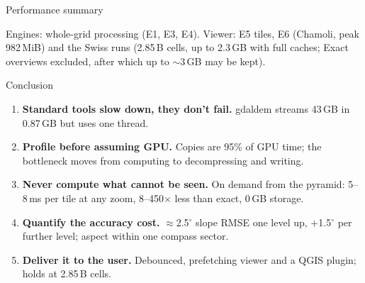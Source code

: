 \documentclass[aspectratio=169,11pt]{beamer}
\begin{document}
\begin{frame}{Performance summary}
\centering
\small
\renewcommand{\arraystretch}{1.2}
\vspace{6pt}
\begin{flushleft}\scriptsize\color{ink2}
Engines: whole-grid processing (E1, E3, E4). Viewer: E5 tiles, E6 (Chamoli, peak 982\,MiB) and the Swiss runs (2.85\,B
cells, up to 2.3\,GB with full caches; Exact overviews excluded, after which up to $\sim$3\,GB may be kept).
\end{flushleft}
\end{frame}

\begin{frame}{Conclusion}
\begin{enumerate}
  \setlength\itemsep{5pt}
  \item \textbf{Standard tools slow down, they don't fail.} gdaldem streams 43\,GB in 0.87\,GB but uses one thread.
  \item \textbf{Profile before assuming GPU.} Copies are 95\% of GPU time; the bottleneck moves from computing to
  decompressing and writing.
  \item \textbf{Never compute what cannot be seen.} On demand from the pyramid: 5--8\,ms per tile at any zoom,
  8--450$\times$ less than exact, 0\,GB storage.
  \item \textbf{Quantify the accuracy cost.} $\approx$2.5$^\circ$ slope RMSE one level up, +1.5$^\circ$ per further level;
  aspect within one compass sector.
  \item \textbf{Deliver it to the user.} Debounced, prefetching viewer and a QGIS plugin; holds at 2.85\,B cells.
\end{enumerate}
\end{frame}
\end{document}
